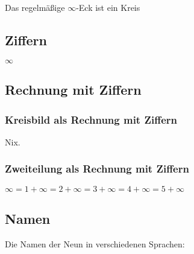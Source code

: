 \documentclass[a4paper]{amsart}
\theoremstyle{definition}
\begin{document}
Das regelmäßige $\infty$-Eck ist ein Kreis
\vspace{\kategoryVspace}


\subsection{Ziffern}
\vspace{\kategoryVspace}

$\infty$

\subsection{Rechnung mit Ziffern}

\subsubsection{Kreisbild als Rechnung mit Ziffern}
Nix.

\subsubsection{Zweiteilung als Rechnung mit Ziffern}
$\infty = 1 + \infty = 2 + \infty = 3 + \infty = 4 + \infty = 5 + \infty$

\subsection{Namen}
Die Namen der Neun in verschiedenen Sprachen:
\vspace{\kategoryVspace}
\end{document}
